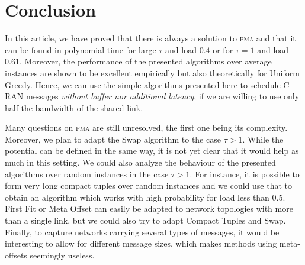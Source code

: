 \documentclass[10pt, conference, letterpaper]{IEEEtran}
\newcommand\pma{\textsc{pma}\xspace}
\begin{document}
\section{Conclusion}

In this article, we have proved that there is always a solution to \pma and that it can be found in polynomial time 
for large $\tau$ and load  $0.4$ or for $\tau = 1$ and load $0.61$. Moreover, the performance of the presented algorithms over average instances are shown to be excellent empirically but also theoretically for Uniform Greedy.
Hence, we can use the simple algorithms presented here to schedule C-RAN messages \emph{without buffer nor additional latency}, if we are willing to use only half the bandwidth of the shared link. 

Many questions on \pma are still unresolved, the first one being its complexity.
Moreover, we plan to adapt the Swap algorithm to the case $\tau > 1$. While the potential
can be defined in the same way, it is not yet clear that it would help as much in this setting.
We could also analyze the behaviour of the presented algorithms over random instances in the case $\tau > 1$.
For instance, it is possible to form very long compact tuples over random instances and we could
use that to obtain an algorithm which works with high probability for load less than $0.5$. 
First Fit or Meta Offset can easily be adapted to network topologies with more than a single link, but we could also try to adapt Compact Tuples and Swap. Finally, to capture networks carrying several types of messages, it would be interesting to allow for different message sizes, which makes methods using meta-offsets seemingly useless.






 
\end{document}
